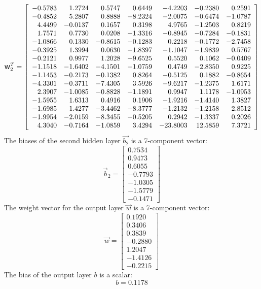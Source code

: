 \documentclass[metals,article,submit,pdftex,moreauthors]{Definitions/mdpi}
\DeclareRobustCommand{\w}{\mbox{\large\ensuremath{\mathsf{w}}}}
\begin{document}
\begin{equation*}
\w_2^T = \left[
\begin{array}{rrrrrrr}
-0.5783 & 1.2724 & 0.5747 & 0.6449 & -4.2203 & -0.2380 & 0.2591 \\
-0.4852 & 5.2807 & 0.8888 & -8.2324 & -2.0075 & -0.6474 & -1.0787 \\
4.4499 & -0.0137 & 0.1657 & 0.3198 & 4.9765 & -1.2503 & 0.8219 \\
1.7571 & 0.7730 & 0.0208 & -1.3316 & -0.8945 & -0.7284 & -0.1831 \\
-1.0866 & 0.1330 & -0.8615 & -0.1283 & 0.2218 & -0.1772 & -2.7458 \\
-0.3925 & 1.3994 & 0.0630 & -1.8397 & -1.1047 & -1.9839 & 0.5767 \\
-0.2121 & 0.9977 & 1.2028 & -9.6525 & 0.5520 & 0.1062 & -0.0409 \\
-1.1518 & -1.6402 & -4.1501 & -1.0759 & 0.4749 & -2.8350 & 0.9225 \\
-1.1453 & -0.2173 & -0.1382 & 0.8264 & -0.5125 & 0.1882 & -0.8654 \\
-4.3301 & -0.3711 & -7.4305 & 3.5926 & -9.6217 & -1.2375 & 1.6171 \\
2.3907 & -1.0085 & -0.8828 & -1.1891 & 0.9947 & 1.1178 & -1.0953 \\
-1.5955 & 1.6313 & 0.4916 & 0.1906 & -1.9216 & -1.4140 & 1.3827 \\
-1.6985 & 1.4277 & -3.4462 & -8.3777 & -1.2132 & -1.2158 & 2.8512 \\
-1.9954 & -2.0159 & -8.3455 & -0.5205 & 0.2942 & -1.3337 & 0.2026 \\
4.3040 & -0.7164 & -1.0859 & 3.4294 & -23.8003 & 12.5859 & 7.3721
\end{array}\right]
\end{equation*}
The biases of the second hidden layer $\overrightarrow{b_2}$ is a 7-component vector:
\begin{equation*}
\overrightarrow{b}_2 = \left[
\begin{array}{r}
0.7534 \\
0.9473 \\
0.6055 \\
-0.7793 \\
-1.0305 \\
-1.5779 \\
-0.1471
\end{array}\right]
\end{equation*}
The weight vector for the output layer $\overrightarrow{w}$ is a 7-component vector:
\begin{equation*}
\overrightarrow{w} = \left[
\begin{array}{r}
0.1920 \\
0.3406 \\
0.3839 \\
-0.2880 \\
1.2047 \\
-1.4126 \\
-0.2215
\end{array}\right]
\end{equation*}
The bias of the output layer $b$ is a scalar:
\begin{equation*}
b = 0.1178
\end{equation*}
\end{document}
